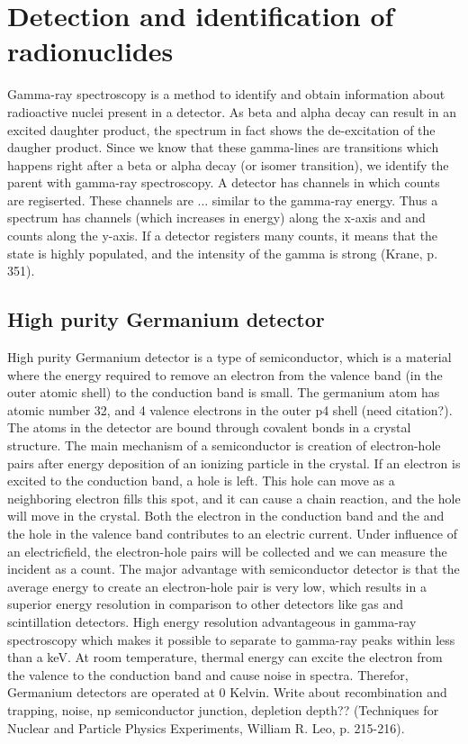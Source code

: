 \documentclass[a4paper,11pt,twoside]{book}
\begin{document}
\section{Detection and identification of radionuclides}
Gamma-ray spectroscopy is a method to identify and obtain information about radioactive nuclei present in a detector. As beta and alpha decay can result in an excited daughter product, the spectrum in fact shows the de-excitation of the daugher product. Since we know that these gamma-lines are transitions which happens right after a beta or alpha decay (or isomer transition), we identify the parent with gamma-ray spectroscopy. A detector has channels in which counts are regiserted. These channels are ... similar to the gamma-ray energy. Thus a spectrum has channels (which increases in energy) along the x-axis and and counts along the y-axis. If a detector registers many counts, it means that the state is highly populated, and the intensity of the gamma is strong (Krane, p. 351). 



\subsection{High purity Germanium detector}
High purity Germanium detector is a type of semiconductor, which is a material where the energy required to remove an electron from the valence band (in the outer atomic shell) to the conduction band is small. The germanium atom has atomic number 32, and 4 valence electrons in the outer p4 shell (need citation?). The atoms in the detector are bound through covalent bonds in a crystal structure. The main mechanism of a semiconductor is creation of electron-hole pairs after energy deposition of an ionizing particle in the crystal. If an electron is excited to the conduction band, a hole is left. This hole can move as a neighboring electron fills this spot, and it can cause a chain reaction, and the hole will move in the crystal. Both the electron in the conduction band and the  and the hole in the valence band contributes to an electric current. Under influence of an electricfield, the electron-hole pairs will be collected and we can measure the incident as a count. The major
advantage with semiconductor detector is that the average energy to create an electron-hole pair is
very low, which results in a superior energy resolution in comparison to other detectors like gas and
scintillation detectors. High energy resolution advantageous in gamma-ray spectroscopy which makes
it possible to separate to gamma-ray peaks within less than a keV. At room temperature, thermal
energy can excite the electron from the valence to the conduction band and cause noise in spectra.
Therefor, Germanium detectors are operated at 0 Kelvin. Write about recombination and trapping,
noise, np semiconductor junction, depletion depth?? (Techniques for Nuclear and Particle Physics Experiments, William R. Leo, p. 215-216). 
\end{document}
